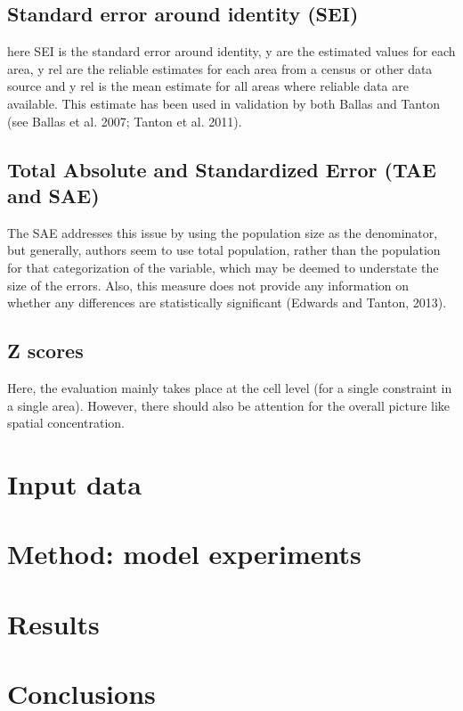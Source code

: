 \documentclass[a4paper,10pt]{article}
\begin{document}

\subsection{Standard error around identity (SEI)}
here SEI is the standard error around identity, y are the estimated values for 
each area, y rel are the reliable estimates for each area from a census or other 
data source and y rel is the mean estimate for all areas where reliable data are available. 
This estimate has been used in validation by both Ballas and Tanton (see Ballas et al. 2007; Tanton et al. 2011).

\subsection{Total Absolute and Standardized Error (TAE and SAE)}
The SAE addresses this issue by using the population size as the denominator,
 but generally, authors seem to use total population, rather than the population 
for that categorization of the variable, which may be deemed to understate the size 
of the errors. Also, this measure does not provide any information on whether any
 differences are statistically significant (Edwards and Tanton, 2013).

\subsection{Z scores}
Here, the evaluation mainly takes place at the cell level (for a single constraint in a single area). 
However, there should also be attention for the overall picture like spatial concentration.


\section{Input data}
\section{Method: model experiments}
\section{Results}
\label{cresults}
\section{Conclusions}


\end{document}
